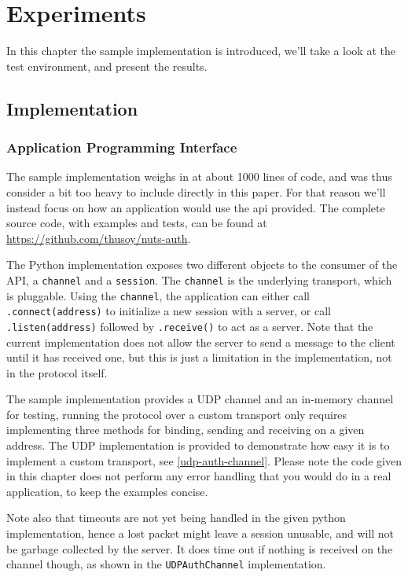 \chapter{Experiments}
\label{chp:experiments}

In this chapter the sample implementation is introduced, we'll take a look at the test environment, and present the results.


\section{Implementation}\label{sec:implementation}

    \subsection{Application Programming Interface}

The sample implementation weighs in at about 1000 lines of code, and was thus consider a bit too heavy to include directly in this paper. For that reason we'll instead focus on how an application would use the \gls{api} provided. The complete source code, with examples and tests, can be found at \url{https://github.com/thusoy/nuts-auth}.

The Python implementation exposes two different objects to the consumer of the API, a \texttt{channel} and a \texttt{session}. The \texttt{channel} is the underlying transport, which is pluggable. Using the \texttt{channel}, the application can either call \texttt{.connect(address)} to initialize a new session with a server, or call \texttt{.listen(address)} followed by \texttt{.receive()} to act as a server. Note that the current implementation does not allow the server to send a message to the client until it has received one, but this is just a limitation in the implementation, not in the protocol itself.

The sample implementation provides a UDP channel and an in-memory channel for testing, running the protocol over a custom transport only requires implementing three methods for binding, sending and receiving on a given address. The UDP implementation is provided to demonstrate how easy it is to implement a custom transport, see \autoref{udp-auth-channel}. Please note the code given in this chapter does not perform any error handling that you would do in a real application, to keep the examples concise.

Note also that timeouts are not yet being handled in the given python implementation, hence a lost packet might leave a session unusable, and will not be garbage collected by the server. It does time out if nothing is received on the channel though, as shown in the \texttt{UDPAuthChannel} implementation.

